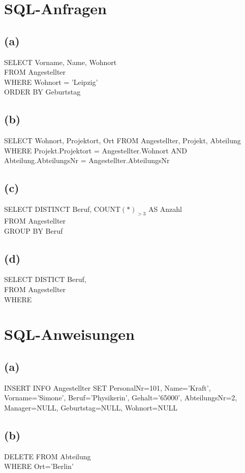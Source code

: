\documentclass{article}
\begin{document}
\section{SQL-Anfragen}
\subsection{(a)}
SELECT Vorname, Name, Wohnort\\
FROM Angestellter\\
WHERE Wohnort = 'Leipzig'\\
ORDER BY Geburtstag\\

\subsection{(b)}
SELECT Wohnort, Projektort, Ort
FROM Angestellter, Projekt, Abteilung\\
WHERE Projekt.Projektort = Angestellter.Wohnort
AND Abteilung.AbteilungsNr = Angestellter.AbteilungsNr \\
 
 
\subsection{(c)}
SELECT DISTINCT Beruf, COUNT$(*)_{>3}$ AS Anzahl\\
FROM Angestellter\\
GROUP BY Beruf\\


\subsection{(d)}
SELECT DISTICT Beruf, \\
FROM Angestellter \\
WHERE 




\section{SQL-Anweisungen}
\subsection{(a)}
INSERT INFO Angestellter 
SET PersonalNr=101, Name='Kraft', Vorname='Simone', Beruf='Physikerin', Gehalt='65000', AbteilungsNr=2,
Manager=NULL, Geburtstag=NULL, Wohnort=NULL

\subsection{(b)}
DELETE FROM Abteilung\\
WHERE Ort='Berlin'\\
\end{document}
